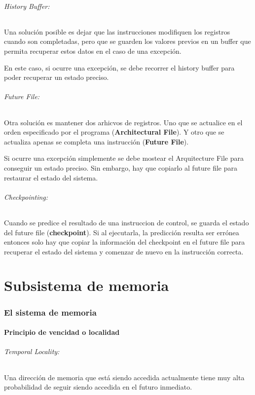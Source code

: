 \paragraph{History Buffer:} Una solución posible es dejar que las instrucciones modifiquen los registros cuando son completadas, pero que se guarden los valores previos en un buffer que permita recuperar estos datos en el caso de una excepción.

En este caso, si ocurre una excepción, se debe recorrer el history buffer para poder recuperar un estado preciso.

\paragraph{Future File:} Otra solución es mantener dos arhicvos de registros. Uno que se actualice en el orden especificado por el programa (\textbf{Architectural File}). Y otro que se actualiza apenas se completa una instrucción (\textbf{Future File}).

Si ocurre una excepción simplemente se debe mostear el Arquitecture File para conseguir un estado preciso. Sin embargo, hay que copiarlo al future file para restaurar el estado del sistema.

\paragraph{Checkpointing:} Cuando se predice el resultado de una instruccion de control, se guarda el estado del future file (\textbf{checkpoint}). Si al ejecutarla, la predicción resulta ser errónea entonces solo hay que copiar la información del checkpoint en el future file para recuperar el estado del sistema y comenzar de nuevo en la instrucción correcta.  

\newpage
\part{Subsistema de memoria}
\section{El sistema de memoria}
\subsection{Principio de vencidad o localidad}
\paragraph{Temporal Locality:} Una dirección de memoria que está siendo accedida actualmente tiene muy alta probabilidad de seguir siendo accedida en el futuro inmediato.

